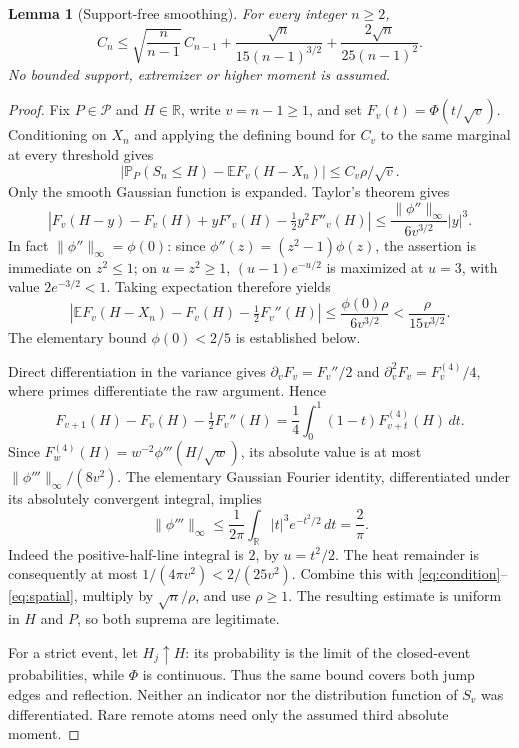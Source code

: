 \documentclass[11pt,a4paper]{article}
\newtheorem{lemma}{Lemma}
\newcommand{\E}{\mathbb E}
\newcommand{\Pp}{\mathbb P}
\begin{document}
\begin{lemma}[Support-free smoothing]\label{lem:smooth}
For every integer $n\ge2$,
\begin{equation}\label{eq:smooth}
 C_n\le\sqrt{\frac n{n-1}}\,C_{n-1}
       +\frac{\sqrt n}{15(n-1)^{3/2}}
       +\frac{2\sqrt n}{25(n-1)^2}.
\end{equation}
No bounded support, extremizer or higher moment is assumed.
\end{lemma}
\begin{proof}
Fix $P\in\mathcal P$ and $H\in\mathbb R$, write $v=n-1\ge1$, and set
$F_v(t)=\Phi(t/\sqrt v)$. Conditioning on $X_n$ and applying the defining
bound for $C_v$ to the same marginal at every threshold gives
\begin{equation}\label{eq:condition}
 |\Pp_P(S_n\le H)-\E F_v(H-X_n)|\le C_v\rho/\sqrt v.
\end{equation}
Only the smooth Gaussian function is expanded. Taylor's theorem gives
\[
 |F_v(H-y)-F_v(H)+yF'_v(H)-\tfrac12 y^2F''_v(H)|
 \le\frac{\|\phi''\|_\infty}{6v^{3/2}}|y|^3.
\]
In fact $\|\phi''\|_\infty=\phi(0)$: since
$\phi''(z)=(z^2-1)\phi(z)$, the assertion is immediate on $z^2\le1$;
on $u=z^2\ge1$, $(u-1)e^{-u/2}$ is maximized at $u=3$, with value
$2e^{-3/2}<1$. Taking expectation therefore yields
\begin{equation}\label{eq:spatial}
 |\E F_v(H-X_n)-F_v(H)-\tfrac12F_v''(H)|
 \le\frac{\phi(0)\rho}{6v^{3/2}}<\frac{\rho}{15v^{3/2}}.
\end{equation}
The elementary bound $\phi(0)<2/5$ is established below.

Direct differentiation in the variance gives
$\partial_vF_v=F_v''/2$ and $\partial_v^2F_v=F_v^{(4)}/4$, where primes
differentiate the raw argument. Hence
\[
 F_{v+1}(H)-F_v(H)-\tfrac12F_v''(H)
 =\frac14\int_0^1(1-t)F_{v+t}^{(4)}(H)\,dt.
\]
Since $F_w^{(4)}(H)=w^{-2}\phi'''(H/\sqrt w)$, its absolute value is at most
$\|\phi'''\|_\infty/(8v^2)$. The elementary Gaussian Fourier identity,
differentiated under its absolutely convergent integral, implies
\[
 \|\phi'''\|_\infty\le
 \frac1{2\pi}\int_{\mathbb R}|t|^3e^{-t^2/2}\,dt=\frac2\pi.
\]
Indeed the positive-half-line integral is $2$, by $u=t^2/2$.
The heat remainder is consequently at most
$1/(4\pi v^2)<2/(25v^2)$. Combine this with
\eqref{eq:condition}--\eqref{eq:spatial}, multiply by $\sqrt n/\rho$,
and use $\rho\ge1$. The resulting estimate is uniform in $H$ and $P$,
so both suprema are legitimate.

For a strict event, let $H_j\uparrow H$: its probability is the limit of the
closed-event probabilities, while $\Phi$ is continuous. Thus the same
bound covers both jump edges and reflection. Neither an indicator nor
the distribution function of $S_v$ was differentiated. Rare remote atoms
need only the assumed third absolute moment.
\end{proof}
\end{document}
